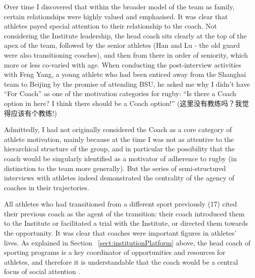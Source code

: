 \begin{CJK}{UTF8}{gbsn}
Over time I discovered that within the broader model of the team as family, certain relationships were highly valued and emphasised. It was clear that athletes payed special attention to their relationship to the coach.  Not considering the Institute leadership, the head coach sits clearly at the top of the apex of the team, followed by the senior athletes (Han and Lu - the old guard were also transitioning coaches), and then from there in order of seniority, which more or less co-varied with age.  When conducting the post-interview activities with Feng Yang, a young athlete who had been enticed away from the Shanghai team to Beijing by the promise of attending BSU, he asked me why I didn't have ``For Coach'' as one of the motivation categories for rugby:  ``Is there a Coach option in here?  I think there should be a Coach option!'' (这里没有教练吗？我觉得应该有个教练!)

Admittedly, I had not originally considered the Coach as a core category of athlete motivation, mainly because at the time I was not as attentive to the hierarchical structure of the group, and in particular the possibility that the coach would be singularly identified as a motivator of adherence to rugby (in distinction to the team more generally).  But the series of semi-structured interviews with athletes indeed demonstrated the centrality of the agency of coaches in their trajectories.

All athletes who had transitioned from a different sport previously (17) cited their previous coach as the agent of the transition: their coach introduced them to the Institute or facilitated a trial with the Institute, or directed them towards the opportunity.  It was clear that coaches were important figures in athletes' lives.  As explained in Section ~\ref{sect:institutionPlatform} above, the head coach of sporting programs is a key coordinator of opportunities and resources for athletes, and therefore it is understandable that the coach would be a central focus of social attention \citep{Yuki2005}.


\end{CJK}
